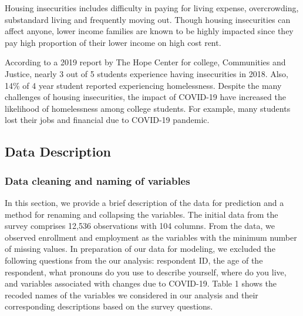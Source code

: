 \documentclass[
  10pt,
]{article}
\begin{document}
Housing insecurities includes difficulty in paying for living expense, overcrowding, substandard living and frequently moving out. Though housing insecurities can affect anyone, lower income families are known to be highly impacted since they pay high proportion of their lower income on high cost rent.

According to a 2019 report by The Hope Center for college, Communities and Justice, nearly 3 out of 5 students experience having insecurities in 2018. Also, 14\% of 4 year student reported experiencing homelessness. Despite the many challenges of housing insecurities, the impact of COVID-19 have increased the likelihood of homelessness among college students. For example, many students lost their jobs and financial due to COVID-19 pandemic.

\subsection{Data Description}

\subsubsection{Data cleaning and naming of variables}

In this section, we provide a brief description of the data for prediction and a method for renaming and collapsing the variables. The initial data from the survey comprises 12,536 observations with 104 columns. From the data, we observed enrollment and employment as the variables with the minimum number of missing values. In preparation of our data for modeling, we excluded the following questions from the our analysis: respondent ID, the age of the respondent, what pronouns do you use to describe yourself, where do you live, and variables associated with changes due to COVID-19. Table 1 shows the recoded names of the variables we considered in our analysis and their corresponding descriptions based on the survey questions.
\end{document}
